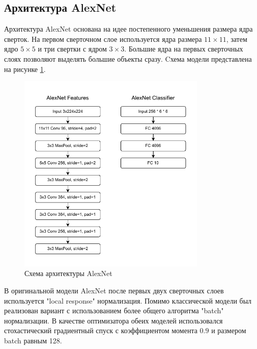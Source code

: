 \subsection{Архитектура AlexNet}
Архитектура AlexNet основана на идее постепенного уменьшения размера ядра сверток.
На первом сверточном слое используется ядра размера $11 \times 11$, затем ядро $5 \times 5$ и три свертки с ядром $3 \times 3$.
Большие ядра на первых сверточных слоях позволяют выделять большие объекты сразу.
Cхема модели представлена на рисунке \ref{fig:alexnet}.
\begin{figure}[h]
    \centering
    \includegraphics[width=0.8\textwidth]{images/alexnet_model.pdf}
    \caption{Схема архитектуры AlexNet}
    \label{fig:alexnet}
\end{figure}

В оригинальной модели AlexNet после первых двух сверточных слоев используется "local response" нормализация.
Помимо классической модели был реализован вариант с использованием более общего алгоритма "batch" нормализации.
В качестве оптимизатора обеих моделей использовался стохастический градиентный спуск с коэффициентом момента $0.9$ и размером batch равным 128.

